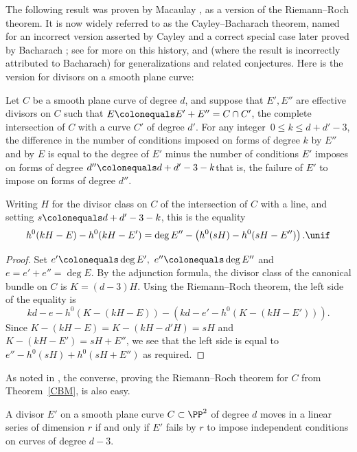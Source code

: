 The following result was proven by Macaulay \cite[p.~424]{Macaulay1900}, as a version of the Riemann--Roch theorem. It is now widely referred to as the Cayley--Bacharach theorem, named for an
%
%
incorrect version asserted by Cayley and a correct special case later proved by
Bacharach \cite{Bacharach1886}; see \cite[Section 2.3]{eisenbud-gray} for more on this history, and 
\cite{MR1376653} (where the result is incorrectly attributed to Bacharach) for generalizations and related conjectures. Here is the version for divisors on a smooth plane curve:

\begin{theorem}\label{CBM} Let $C$ be a smooth plane curve of degree $d$, and suppose that
$E', E''$ are effective divisors on $C$ such that $E\colonequals E'+E'' = C\cap C'$, the complete intersection of $C$
with a curve $C'$ of degree $d'$. For any integer 
$\,0\leq k \leq d+d'-3$, the difference in the number of conditions imposed 
on forms of degree $k$ by $E''$ and by $E$ is equal to the degree of $E'$ minus the
number of conditions $E'$ imposes on forms of degree 
$d''\colonequals d+d'-3 -k$\emdash that is, the failure of
$E'$ to impose 
%
on forms of degree $d''$.

 Writing $H$ for
the divisor class on $C$ of the intersection of $C$ with a line, and setting $s \colonequals d+d'-3-k$, this is the equality
$$
h^0(kH-E) - h^0(kH-E')  = \deg E'' - \left(h^0(sH) -  h^0(sH-E'')\right)
.
\unif
$$
\end{theorem}

\begin{proof}
Set $e' \colonequals \deg E', \ e''\colonequals \deg E''$ and $e = e'+e'' = \deg E.$
By the adjunction formula, the divisor class of the canonical bundle
on $C$ is $K = (d-3)H$. Using the Riemann--Roch theorem, the left side
of the equality is 
$$
kd-e-h^0(K - (kH-E)) - \left(kd-e' - h^0(K-(kH-E'))\right).
$$
Since $K - (kH-E) = K - (kH-d'H) = sH$ and  $K-(kH-E') = sH+E''$, we see that the 
left side is equal to 
$
e'' - h^0(sH) +  h^0(sH+E'')
$
as required.
\unif
\end{proof}

As noted in \cite{eisenbud-gray}, the converse, proving the Riemann--Roch theorem for $C$ from Theorem~\ref{CBM}, is also easy.

\begin{corollary}\label{CBM cor 1}
A divisor $E'$ on a smooth plane curve $C\subset \PP^2$ of degree $d$ moves
in a linear series of dimension $r$ if and only if $E'$ fails by $r$ to impose
independent conditions on curves of degree $d-3$.
\unif
\end{corollary}

